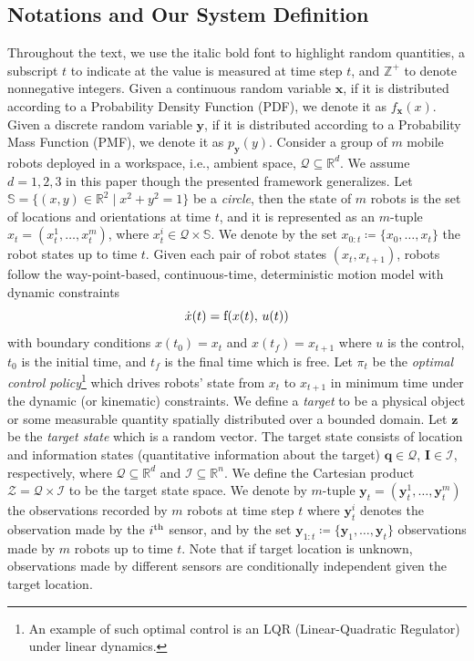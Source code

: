 \documentclass[journal]{IEEEtran}
\begin{document}
\subsection{Notations and Our System Definition}
Throughout the text, we use the italic bold font to highlight random quantities, a subscript $t$ to indicate at the value is measured at time step $t$, and $\mathbb{Z}^{+}$ to denote nonnegative integers. Given a continuous random variable $\bm{x}$, if it is distributed according to a Probability Density Function (PDF), we denote it as $f_{\bm{x}}(x)$. Given a discrete random variable $\bm{y}$, if it is distributed according to a Probability Mass Function (PMF), we denote it as $p_{\bm{y}}(y)$.
Consider a group of $m$ mobile robots deployed in a workspace, i.e., ambient space, $\mathcal{Q} \subseteq \mathbb{R}^d$. We assume $d=1,2,3$ in this paper though the presented framework generalizes. Let $\mathbb{S} =  \lbrace (x,y)\in \mathbb{R}^2\mid x^2+y^2=1 \rbrace$ be a \emph{circle}, then the state of $m$ robots is the set of locations and orientations at time $t$, and it is represented as an $m$-tuple $x_t = (x_t^1,\dots,x_t^m)$, where $x_t^i \in \mathcal{Q} \times \mathbb{S}$. We denote by the set  ${x}_{0:t}\coloneqq \lbrace {x}_0,\dots,{x}_t \rbrace$ the robot states up to time $t$. 
Given each pair of robot states $(x_t,x_{t+1})$, robots follow the way-point-based, continuous-time, deterministic motion model with dynamic constraints
\begin{equation}
\dot{x}(t) = \textup{f}(x(t),\,u(t))
\label{eq:constraint}
\end{equation}
with boundary conditions $x(t_0) = x_t$ and $x(t_f) = x_{t+1}$ where $u$ is the control, $t_0$ is the initial time, and $t_f$ is the final time which is free. Let $\pi_t$ be the \emph{optimal control policy}\footnote{An example of such optimal control is an LQR (Linear-Quadratic Regulator) under linear dynamics.} which drives robots' state from $x_t$ to $x_{t+1}$ in minimum time under the dynamic (or kinematic) constraints.
We define a \emph{target} to be a physical object or some measurable quantity spatially distributed over a bounded domain.
Let $\bm{z}$ be the \emph{target state} which is a random vector. The target state consists of location and information states (quantitative information about the target) $\bm{q} \in \mathcal{Q}$, $\bm{I} \in \mathcal{I}$, respectively, where $\mathcal{Q} \subseteq \mathbb{R}^d$ and $\mathcal{I} \subseteq \mathbb{R}^n$. We define the Cartesian product $\mathcal{Z} = \mathcal{Q} \times \mathcal{I}$ to be the target state space.
We denote by $m$-tuple $\bm{y}_t=(\bm{y}_t^1,\dots,\bm{y}_t^m)$ the observations recorded by $m$ robots at time step $t$ where $\bm{y}_t^i$ denotes the observation made by the $i^{\textup{th}}$ sensor, and by the set $\bm{y}_{1:t}\coloneqq \lbrace \bm{y}_1,\dots,\bm{y}_t \rbrace$ observations made by $m$ robots up to time $t$. Note that if target location is unknown, observations made by different sensors are conditionally independent given the target location.
\end{document}
